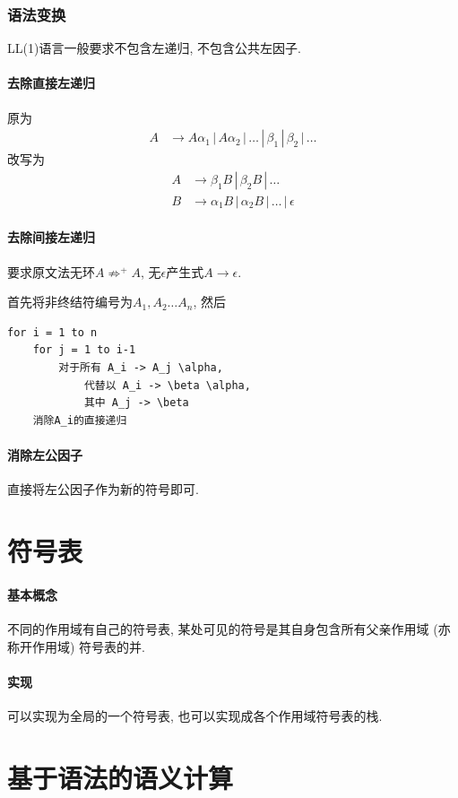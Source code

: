 \documentclass{ctexart}
\begin{document}
\subsubsection{语法变换}
    LL(1)语言一般要求不包含左递归, 不包含公共左因子.
\paragraph{去除直接左递归} 原为\begin{align*}
        A & \to A \alpha_1 \,|\, A \alpha_2 \,|\, \ldots \,|\, \beta_1 \,|\, \beta_2 \,|\, \ldots
    \end{align*}改写为\begin{align*}
        A &\to \beta_1 B \,|\, \beta_2 B \,|\, \ldots \\
        B &\to \alpha_1 B \,|\, \alpha_2 B \,|\, \ldots \,|\, \epsilon
    \end{align*}
\paragraph{去除间接左递归} 要求原文法无环$A \not\Rightarrow^+ A$, 无$\epsilon$产生式$A \to \epsilon$.\par
    首先将非终结符编号为$A_1, A_2 \ldots A_n$, 然后\begin{verbatim} 
for i = 1 to n
    for j = 1 to i-1
        对于所有 A_i -> A_j \alpha,
            代替以 A_i -> \beta \alpha,
            其中 A_j -> \beta
    消除A_i的直接递归
\end{verbatim}
\paragraph{消除左公因子} 直接将左公因子作为新的符号即可.


\section{符号表}
\paragraph{基本概念}
    不同的作用域有自己的符号表, 某处可见的符号是其自身包含所有父亲作用域 (亦称开作用域) 符号表的并.
\paragraph{实现} 可以实现为全局的一个符号表, 也可以实现成各个作用域符号表的栈.

\section{基于语法的语义计算}
\end{document}

